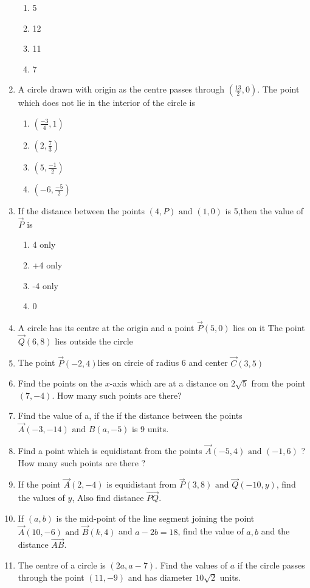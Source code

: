 \documentclass[12pt]{article}
\begin{document}
\begin{enumerate}[label=\thesection.\arabic*,ref=\thesection.\theenumi]
\begin{enumerate}
\item 5
\item 12
\item 11
\item 7
\end{enumerate}
\item A circle drawn with origin as the
centre passes through 
$(\frac{13}{2},0)$. The
point which does not lie in the
interior of the circle is
\begin{enumerate}
\item $(\frac{-3}{4},1)$
\item $(2,\frac{7}{3})$
\item $(5,\frac{-1}{2})$
\item $(-6,\frac{-5}{2})$
\end{enumerate}
\item If the distance between the points $(4,P) \text{ and } (1,0)$ is 5,then the value of $\vec{P}$ is
\begin{enumerate}                       
\item4 only
\item+4 only
\item-4 only
\item0
\end{enumerate}
\item A circle has its centre at the origin and a point $\vec{P}(5,0)$ lies on it The point $\vec{Q}(6,8)$ lies outside the circle
 \item The point $\vec{P}(-2,4)$lies on circie of radius 6 and center $\vec{C}(3,5)$
\item Find the points on the $x$-axis which are at a distance on $2\sqrt{5}$ from the point$ (7,-4).$ How many such points are there?
\item Find the value of a, if the if the distance between the points $\vec{A}(-3,-14) \text{ and }{B}(a,-5)$ is 9 units.
\item Find a point which is equidistant from the points $\vec{A}(-5,4) \text{ and }(-1,6)$ ? How many such points are there ?
\item If the point $\vec{A}(2,-4)$ is equidistant from $\vec{P}(3,8) \text{ and }\vec{Q}(-10,y)$, find the values of $y$, Also find distance $\vec{PQ}$.
\item If $(a,b)$ is the mid-point of the line segment joining the point $\vec{A}(10,-6)\text{ and }\vec{B}(k,4)$ and $a-2b=18$, find the value of $a,b$ and the distance $\vec{AB}$.
\item The centre of a circle is $(2a,a-7)$. Find the values of $a$ if the circle passes through the point $(11,-9)$ and has diameter $10\sqrt{2}$ units.
\end{enumerate}
\end{document}
